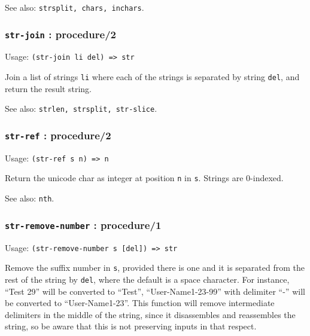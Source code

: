 \documentclass[
]{article}
\newcommand{\passthrough}[1]{#1}
\begin{document}
See also: \passthrough{\lstinline!strsplit, chars, inchars!}.

\hypertarget{str-join-procedure2}{%
\subsubsection{\texorpdfstring{\texttt{str-join} :
procedure/2}{str-join : procedure/2}}\label{str-join-procedure2}}

Usage: \passthrough{\lstinline!(str-join li del) => str!}

Join a list of strings \passthrough{\lstinline!li!} where each of the
strings is separated by string \passthrough{\lstinline!del!}, and return
the result string.

See also: \passthrough{\lstinline!strlen, strsplit, str-slice!}.

\hypertarget{str-ref-procedure2}{%
\subsubsection{\texorpdfstring{\texttt{str-ref} :
procedure/2}{str-ref : procedure/2}}\label{str-ref-procedure2}}

Usage: \passthrough{\lstinline!(str-ref s n) => n!}

Return the unicode char as integer at position
\passthrough{\lstinline!n!} in \passthrough{\lstinline!s!}. Strings are
0-indexed.

See also: \passthrough{\lstinline!nth!}.

\hypertarget{str-remove-number-procedure1}{%
\subsubsection{\texorpdfstring{\texttt{str-remove-number} :
procedure/1}{str-remove-number : procedure/1}}\label{str-remove-number-procedure1}}

Usage: \passthrough{\lstinline!(str-remove-number s [del]) => str!}

Remove the suffix number in \passthrough{\lstinline!s!}, provided there
is one and it is separated from the rest of the string by
\passthrough{\lstinline!del!}, where the default is a space character.
For instance, ``Test 29'' will be converted to ``Test'',
``User-Name1-23-99'' with delimiter ``-'' will be converted to
``User-Name1-23''. This function will remove intermediate delimiters in
the middle of the string, since it disassembles and reassembles the
string, so be aware that this is not preserving inputs in that respect.
\end{document}
